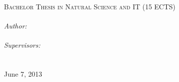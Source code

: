 \documentclass[11pt, a4paper, oneside]{Thesis} %
\title{\ttitle} %
\begin{document}
\frontmatter %


\fancyhead{} %
\rhead{\thepage} %
\lhead{} %

\pagestyle{fancy} %

\newcommand{\HRule}{\rule{\linewidth}{0.5mm}} %

\hypersetup{pdfsubject=\subjectname}
\hypersetup{pdfauthor=\authornames}
\hypersetup{pdfkeywords=\keywordnames}



\begin{titlepage}

%                          
% 
\vspace*{5cm}
\textsc{\Large Bachelor Thesis in Natural Science and IT (15 ECTS)}\\[0.5cm] %

{\huge \bfseries \ttitle}\\[1cm] %
\large
\emph{Author:}\\
{\authornames}\\[0.5cm] %
\emph{Supervisors:} \\
{\supname}\\[9cm] %

\deptname\\ %
{\large June 7, 2013} %
 
\vfill

\end{titlepage}
\end{document}
